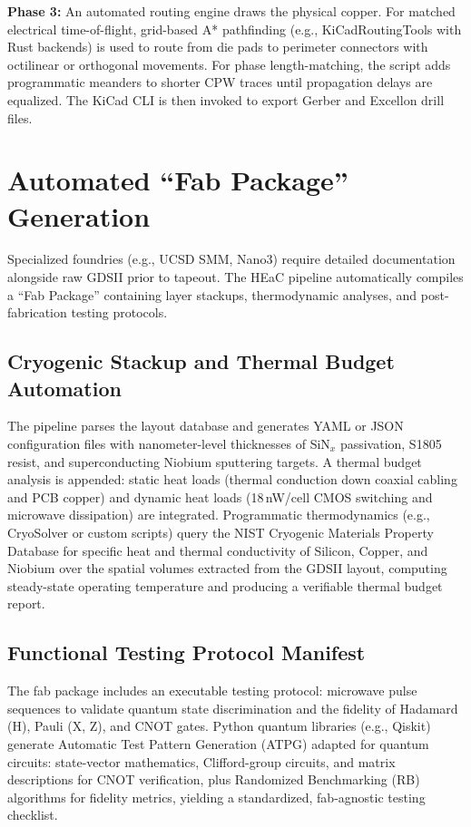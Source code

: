 \documentclass[11pt, a4paper]{article}
\begin{document}
\textbf{Phase 3:} An automated routing engine draws the physical copper. For matched electrical time-of-flight, grid-based A* pathfinding (e.g., KiCadRoutingTools with Rust backends) is used to route from die pads to perimeter connectors with octilinear or orthogonal movements. For phase length-matching, the script adds programmatic meanders to shorter CPW traces until propagation delays are equalized. The KiCad CLI is then invoked to export Gerber and Excellon drill files.

\section{Automated ``Fab Package'' Generation}

Specialized foundries (e.g., UCSD SMM, Nano3) require detailed documentation alongside raw GDSII prior to tapeout. The HEaC pipeline automatically compiles a ``Fab Package'' containing layer stackups, thermodynamic analyses, and post-fabrication testing protocols.

\subsection{Cryogenic Stackup and Thermal Budget Automation}

The pipeline parses the layout database and generates YAML or JSON configuration files with nanometer-level thicknesses of SiN$_x$ passivation, S1805 resist, and superconducting Niobium sputtering targets. A thermal budget analysis is appended: static heat loads (thermal conduction down coaxial cabling and PCB copper) and dynamic heat loads (18\,nW/cell CMOS switching and microwave dissipation) are integrated. Programmatic thermodynamics (e.g., CryoSolver or custom scripts) query the NIST Cryogenic Materials Property Database for specific heat and thermal conductivity of Silicon, Copper, and Niobium over the spatial volumes extracted from the GDSII layout, computing steady-state operating temperature and producing a verifiable thermal budget report.

\subsection{Functional Testing Protocol Manifest}

The fab package includes an executable testing protocol: microwave pulse sequences to validate quantum state discrimination and the fidelity of Hadamard (H), Pauli (X, Z), and CNOT gates. Python quantum libraries (e.g., Qiskit) generate Automatic Test Pattern Generation (ATPG) adapted for quantum circuits: state-vector mathematics, Clifford-group circuits, and matrix descriptions for CNOT verification, plus Randomized Benchmarking (RB) algorithms for fidelity metrics, yielding a standardized, fab-agnostic testing checklist.
\end{document}
